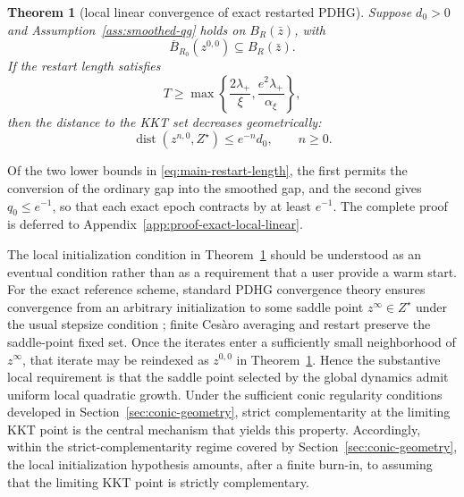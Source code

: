 \documentclass[letterpaper]{article} %
\newtheorem{theorem}{Theorem}[section] %
\theoremstyle{definition}
\theoremstyle{remark}
\begin{document}
\begin{theorem}[local linear convergence of exact restarted PDHG]
\label{thm:exact-local-linear}
\label{thm:main-local-linear}
Suppose $d_0>0$ and Assumption~\ref{ass:smoothed-qg} holds on
$B_R(\bar z)$, with
\begin{equation}
\label{eq:main-theorem-ball}
    \overline B_{R_0}(z^{0,0})
    \subseteq
    B_R(\bar z).
\end{equation}
If the restart length satisfies
\begin{equation}
\label{eq:main-restart-length}
    T
    \ge
    \max\left\{
        \frac{2\lambda_+}{\xi},
        \frac{e^2\lambda_+}{\alpha_\xi}
    \right\},
\end{equation}
then the distance to the KKT set decreases geometrically:
\begin{equation}
\label{eq:main-linear-rate}
    \operatorname{dist}(z^{n,0},Z^\star)
    \le
    e^{-n}d_0,
    \qquad n\ge0.
\end{equation}
\end{theorem}

Of the two lower bounds in \eqref{eq:main-restart-length}, the first permits
the conversion of the ordinary gap into the smoothed gap, and the second
gives $q_0\le e^{-1}$, so that each exact epoch contracts by at least
$e^{-1}$.  The complete proof is deferred to
Appendix~\ref{app:proof-exact-local-linear}.

The local initialization condition in
Theorem~\ref{thm:exact-local-linear} should be understood as an eventual
condition rather than as a requirement that a user provide a warm start.  For
the exact reference scheme, standard PDHG convergence theory ensures
convergence from an arbitrary initialization to some saddle point
$z^\infty\in Z^\star$ under the usual stepsize condition
\cite{chambolle2011first,chambolle2016ergodic}; finite Ces\`aro averaging
and restart preserve the saddle-point fixed set.  Once the iterates enter a
sufficiently small neighborhood of $z^\infty$, that iterate may be reindexed
as $z^{0,0}$ in Theorem~\ref{thm:exact-local-linear}.  Hence the substantive
local requirement is that the saddle point selected by the global dynamics
admit uniform local quadratic growth.  Under the sufficient conic regularity
conditions developed in Section~\ref{sec:conic-geometry}, strict
complementarity at the limiting KKT point is the central mechanism that
yields this property.  Accordingly, within the strict-complementarity regime
covered by Section~\ref{sec:conic-geometry}, the local initialization
hypothesis amounts, after a finite burn-in, to assuming that the 
limiting KKT point is strictly complementary.  
\end{document}
